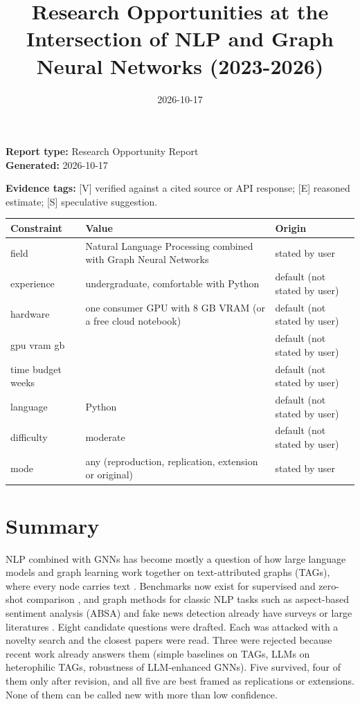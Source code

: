 \documentclass[11pt,a4paper]{article}
\title{Research Opportunities at the Intersection of NLP and Graph Neural Networks (2023-2026)}
\date{2026-10-17}
\begin{document}
\maketitle


\textbf{Report type:} Research Opportunity Report\\
\textbf{Generated:} 2026-10-17

\textbf{Evidence tags:} [V] verified against a cited source or API response; [E] reasoned estimate; [S] speculative suggestion.

{\small
\begin{longtable}{>{\raggedright\arraybackslash}p{}>{\raggedright\arraybackslash}p{}>{\raggedright\arraybackslash}p{}}
\toprule
\textbf{Constraint} & \textbf{Value} & \textbf{Origin} \\
\midrule
\endhead
field & Natural Language Processing combined with Graph Neural Networks & stated by user \\
experience & undergraduate, comfortable with Python & default (not stated by user) \\
hardware & one consumer GPU with 8 GB VRAM (or a free cloud notebook) & default (not stated by user) \\
gpu vram gb & 8 & default (not stated by user) \\
time budget weeks & 8 & default (not stated by user) \\
language & Python & default (not stated by user) \\
difficulty & moderate & default (not stated by user) \\
mode & any (reproduction, replication, extension or original) & stated by user \\
\bottomrule
\end{longtable}
}

\section{Summary}

NLP combined with GNNs has become mostly a question of how large language models and graph learning work together on text-attributed graphs (TAGs), where every node carries text \cite{jin2024llmgraphs,wu2023gnnnlp}. Benchmarks now exist for supervised and zero-shot comparison \cite{li2024glbench,wu2025llmnodebed}, and graph methods for classic NLP tasks such as aspect-based sentiment analysis (ABSA) and fake news detection already have surveys or large literatures \cite{phan2023fakesurvey,gong2023fakesurvey}. Eight candidate questions were drafted. Each was attacked with a novelty search and the closest papers were read. Three were rejected because recent work already answers them (simple baselines on TAGs, LLMs on heterophilic TAGs, robustness of LLM-enhanced GNNs). Five survived, four of them only after revision, and all five are best framed as replications or extensions. None of them can be called new with more than low confidence.
\end{document}
